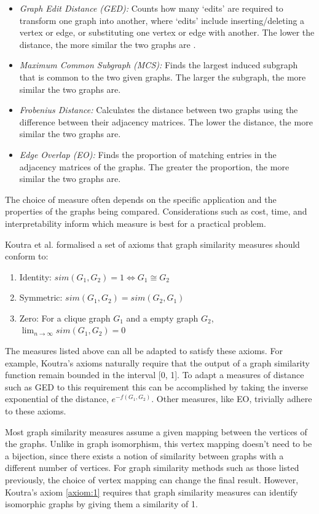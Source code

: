 \begin{itemize}
    \item \textit{Graph Edit Distance (GED):} Counts how many `edits' are required to transform one graph into another, where `edits' include inserting/deleting a vertex or edge, or substituting one vertex or edge with another. The lower the distance, the more similar the two graphs are \cite{GED}.
    \item \textit{Maximum Common Subgraph (MCS):} Finds the largest induced subgraph that is common to the two given graphs. The larger the subgraph, the more similar the two graphs are.
    \item \textit{Frobenius Distance:} Calculates the distance between two graphs using the difference between their adjacency matrices. The lower the distance, the more similar the two graphs are.
    \item \textit{Edge Overlap (EO):} Finds the proportion of matching entries in the adjacency matrices of the graphs. The greater the proportion, the more similar the two graphs are.\cite{QAOA_graph_sim}
\end{itemize}

The choice of measure often depends on the specific application and the properties of the graphs being compared. Considerations such as cost, time, and interpretability inform which measure is best for a practical problem.

Koutra et al. \cite{deltacon} formalised a set of axioms that graph similarity measures should conform to:
\begin{enumerate}
    \item Identity: $sim(G_{1},G_{2})=1 \iff G_{1} \cong G_{2}$ \label{axiom:1}
    \item Symmetric:  $sim(G_{1},G_{2})=sim(G_{2},G_{1})$ \label{axiom:2}
    \item Zero: For a clique graph $G_{1}$ and a empty graph $G_{2}$, 
    $\lim_{n \to \infty} sim(G_{1},G_{2}) = 0$ \label{axiom:3}
\end{enumerate}

The measures listed above can all be adapted to satisfy these axioms. For example, Koutra's axioms naturally require that the output of a graph similarity function remain bounded in the interval [0, 1]. To adapt a measures of distance such as GED to this requirement this can be accomplished by taking the inverse exponential of the distance, $e^{-f(G_1,G_2)}$. Other measures, like EO, trivially adhere to these axioms.

Most graph similarity measures assume a given mapping between the vertices of the graphs. Unlike in graph isomorphism, this vertex mapping doesn't need to be a bijection, since there exists a notion of similarity between graphs with a different number of vertices. For graph similarity methods such as those listed previously, the choice of vertex mapping can change the final result. However, Koutra's axiom \ref{axiom:1} requires that graph similarity measures can identify isomorphic graphs by giving them a similarity of 1.

